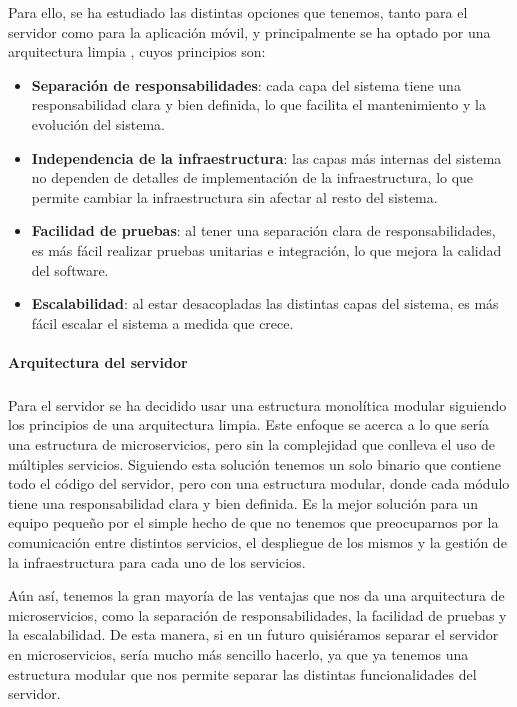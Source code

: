 Para ello, se ha estudiado las distintas opciones que tenemos, tanto para el servidor como para la aplicación móvil, y principalmente se ha optado por una arquitectura limpia \parencite{uncle-bob-clean-architecture}, cuyos principios son:
\begin{itemize}
    \item \textbf{Separación de responsabilidades}: cada capa del sistema tiene una responsabilidad clara y bien definida, lo que facilita el mantenimiento y la evolución del sistema.
    \item \textbf{Independencia de la infraestructura}: las capas más internas del sistema no dependen de detalles de implementación de la infraestructura, lo que permite cambiar la infraestructura sin afectar al resto del sistema.
    \item \textbf{Facilidad de pruebas}: al tener una separación clara de responsabilidades, es más fácil realizar pruebas unitarias e integración, lo que mejora la calidad del software.
    \item \textbf{Escalabilidad}: al estar desacopladas las distintas capas del sistema, es más fácil escalar el sistema a medida que crece.
\end{itemize}

\paragraph{Arquitectura del servidor}
\subparagraph{}
Para el servidor se ha decidido usar una estructura monolítica modular siguiendo los principios de una arquitectura limpia.
Este enfoque se acerca a lo que sería una estructura de microservicios, pero sin la complejidad que conlleva el uso de múltiples servicios.
Siguiendo esta solución tenemos un solo binario que contiene todo el código del servidor, pero con una estructura modular, donde cada módulo tiene una responsabilidad clara y bien definida.
Es la mejor solución para un equipo pequeño por el simple hecho de que no tenemos que preocuparnos por la comunicación entre distintos servicios, el despliegue de los mismos y la gestión de la infraestructura para cada uno de los servicios.

Aún así, tenemos la gran mayoría de las ventajas que nos da una arquitectura de microservicios, como la separación de responsabilidades, la facilidad de pruebas y la escalabilidad.
De esta manera, si en un futuro quisiéramos separar el servidor en microservicios, sería mucho más sencillo hacerlo, ya que ya tenemos una estructura modular que nos permite separar las distintas funcionalidades del servidor.


